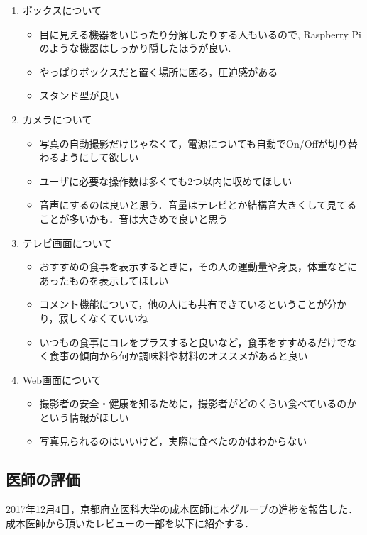 \documentclass[../report]{subfiles}
\begin{document}
\begin{enumerate}
    \item[] ボックスについて
    \begin{itemize}
        \item 目に見える機器をいじったり分解したりする人もいるので, Raspberry Piのような機器はしっかり隠したほうが良い.
        \item やっぱりボックスだと置く場所に困る，圧迫感がある
        \item スタンド型が良い
    \end{itemize}

    \item[] カメラについて
    \begin{itemize}
        \item 写真の自動撮影だけじゃなくて，電源についても自動でOn/Offが切り替わるようにして欲しい
        \item ユーザに必要な操作数は多くても2つ以内に収めてほしい
        \item 音声にするのは良いと思う．音量はテレビとか結構音大きくして見てることが多いかも．音は大きめで良いと思う
    \end{itemize}

    \item[] テレビ画面について
    \begin{itemize}
        \item おすすめの食事を表示するときに，その人の運動量や身長，体重などにあったものを表示してほしい
        \item コメント機能について，他の人にも共有できているということが分かり，寂しくなくていいね
        \item いつもの食事にコレをプラスすると良いなど，食事をすすめるだけでなく食事の傾向から何か調味料や材料のオススメがあると良い
    \end{itemize}

    \item[] Web画面について
    \begin{itemize}
        \item 撮影者の安全・健康を知るために，撮影者がどのくらい食べているのかという情報がほしい
        \item 写真見られるのはいいけど，実際に食べたのかはわからない
    \end{itemize}
\end{enumerate}

\subsection{医師の評価}
2017年12月4日，京都府立医科大学の成本医師に本グループの進捗を報告した．
成本医師から頂いたレビューの一部を以下に紹介する．
\end{document}
